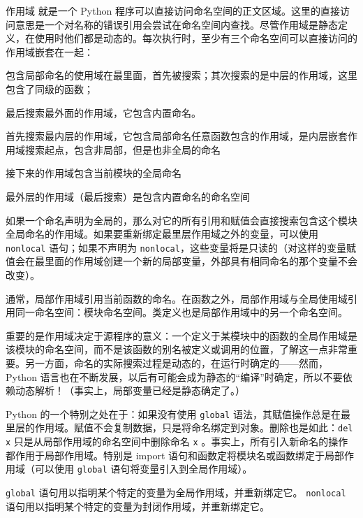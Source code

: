 作用域 就是一个 Python 程序可以直接访问命名空间的正文区域。这里的直接访问意思是一个对名称的错误引用会尝试在命名空间内查找。尽管作用域是静态定义，在使用时他们都是动态的。每次执行时，至少有三个命名空间可以直接访问的作用域嵌套在一起：
\begin{compactitem}
    \item 包含局部命名的使用域在最里面，首先被搜索；其次搜索的是中层的作用域，这里包含了同级的函数；

        最后搜索最外面的作用域，它包含内置命名。
    \item 首先搜索最内层的作用域，它包含局部命名任意函数包含的作用域，是内层嵌套作用域搜索起点，包含非局部，但是也非全局的命名
    \item 接下来的作用域包含当前模块的全局命名
    \item 最外层的作用域（最后搜索）是包含内置命名的命名空间
\end{compactitem}
如果一个命名声明为全局的，那么对它的所有引用和赋值会直接搜索包含这个模块全局命名的作用域。如果要重新绑定最里层作用域之外的变量，可以使用 \texttt{nonlocal} 语句；如果不声明为 \texttt{nonlocal}，这些变量将是只读的（对这样的变量赋值会在最里面的作用域创建一个新的局部变量，外部具有相同命名的那个变量不会改变）。

通常，局部作用域引用当前函数的命名。在函数之外，局部作用域与全局使用域引用同一命名空间：模块命名空间。类定义也是局部作用域中的另一个命名空间。

重要的是作用域决定于源程序的意义：一个定义于某模块中的函数的全局作用域是该模块的命名空间，而不是该函数的别名被定义或调用的位置，了解这一点非常重要。另一方面，命名的实际搜索过程是动态的，在运行时确定的——然而，Python 语言也在不断发展，以后有可能会成为静态的“编译”时确定，所以不要依赖动态解析！（事实上，局部变量已经是静态确定了。）

Python 的一个特别之处在于：如果没有使用 \texttt{global} 语法，其赋值操作总是在最里层的作用域。赋值不会复制数据，只是将命名绑定到对象。删除也是如此：\texttt{del} \texttt{x} 只是从局部作用域的命名空间中删除命名 \texttt{x} 。事实上，所有引入新命名的操作都作用于局部作用域。特别是 import 语句和函数定将模块名或函数绑定于局部作用域（可以使用 \texttt{global} 语句将变量引入到全局作用域）。

\texttt{global} 语句用以指明某个特定的变量为全局作用域，并重新绑定它。 \texttt{nonlocal} 语句用以指明某个特定的变量为封闭作用域，并重新绑定它。

